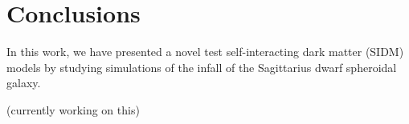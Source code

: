 \hypertarget{conclusions}{%
\chapter{Conclusions}\label{conclusions}}


In this work, we have presented a novel test self-interacting dark matter
(SIDM) models by studying simulations of the infall of the Sagittarius dwarf
spheroidal galaxy.

(currently working on this)
